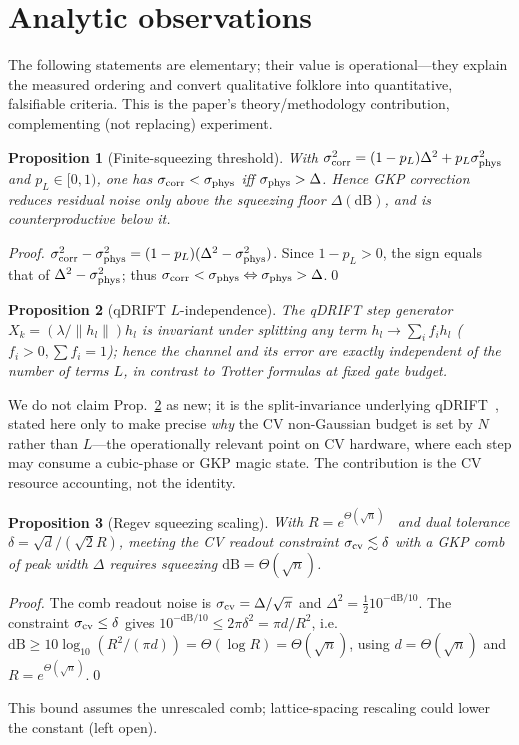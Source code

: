 \documentclass[aps,pra,reprint,superscriptaddress,nofootinbib]{revtex4-2}
\newtheorem{proposition}{Proposition}
\begin{document}
\section{Analytic observations}
The following statements are elementary; their value is operational---they
explain the measured ordering and convert qualitative folklore into
quantitative, falsifiable criteria. This is the paper's theory/methodology
contribution, complementing (not replacing) experiment.
\begin{proposition}[Finite-squeezing threshold]\label{prop:floor}
With $\sigma_{\rm corr}^2=(1-p_L)\Delta^2+p_L\sigma_{\rm phys}^2$ and
$p_L\in[0,1)$, one has $\sigma_{\rm corr}<\sigma_{\rm phys}$ iff
$\sigma_{\rm phys}>\Delta$. Hence GKP correction reduces residual noise only
above the squeezing floor $\Delta(\mathrm{dB})$, and is counterproductive
below it.
\end{proposition}
\begin{proof}
$\sigma_{\rm corr}^2-\sigma_{\rm phys}^2=(1-p_L)(\Delta^2-\sigma_{\rm phys}^2)$.
Since $1-p_L>0$, the sign equals that of $\Delta^2-\sigma_{\rm phys}^2$;
thus $\sigma_{\rm corr}<\sigma_{\rm phys}\Leftrightarrow\sigma_{\rm phys}
>\Delta$.\qed
\end{proof}
\begin{proposition}[qDRIFT $L$-independence]\label{prop:qdrift}
The qDRIFT step generator $X_k=(\lambda/\lVert h_l\rVert)h_l$ is invariant
under splitting any term $h_l\to\sum_i f_i h_l$ ($f_i>0,\sum f_i=1$); hence the
channel and its error are exactly independent of the number of terms $L$, in
contrast to Trotter formulas at fixed gate budget.
\end{proposition}
We do not claim Prop.~\ref{prop:qdrift} as new; it is the split-invariance
underlying qDRIFT~\cite{Campbell2019,Chen2021}, stated here only to make
precise \emph{why} the CV non-Gaussian budget is set by $N$ rather than
$L$---the operationally relevant point on CV hardware, where each step may
consume a cubic-phase or GKP magic state. The contribution is the CV resource accounting, not the identity.
\begin{proposition}[Regev squeezing scaling]\label{prop:regev}
With $R=e^{\Theta(\sqrt{n})}$~\cite{Regev2023} and dual tolerance
$\delta=\sqrt{d}/(\sqrt2 R)$, meeting the CV readout constraint
$\sigma_{\rm cv}\lesssim\delta$ with a GKP
comb of peak width $\Delta$ requires squeezing $\mathrm{dB}=\Theta(\sqrt{n})$.
\end{proposition}
\begin{proof}
The comb readout noise is $\sigma_{\rm cv}=\Delta/\sqrt\pi$ and
$\Delta^2=\tfrac12 10^{-\mathrm{dB}/10}$. The constraint
$\sigma_{\rm cv}\le\delta$ gives
$10^{-\mathrm{dB}/10}\le 2\pi\delta^2=\pi d/R^2$, i.e.
$\mathrm{dB}\ge 10\log_{10}(R^2/(\pi d))=\Theta(\log R)=\Theta(\sqrt n)$,
using $d=\Theta(\sqrt n)$ and $R=e^{\Theta(\sqrt n)}$.\qed
\end{proof}
This bound assumes the unrescaled comb; lattice-spacing rescaling could lower
the constant (left open).
\end{document}
